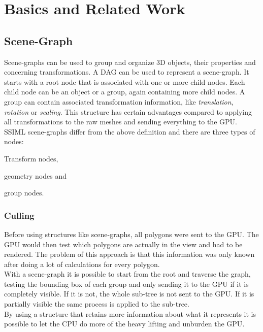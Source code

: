 
\section{Basics and Related Work}
\label{basics-and-related-work}

\subsection{Scene-Graph}\label{scene-graph}

Scene-graphs can be used to group and organize \gls{3D} objects, their properties and
concerning transformations. A \gls{DAG} can be used to represent a scene-graph.
It starts with a root node that is associated with one or more child nodes. Each
child node can be an object or a group, again containing more child nodes. A group can
contain associated transformation information, like \emph{translation},
\emph{rotation} or \emph{scaling}. This structure has certain advantages
compared to applying all transformations to the raw meshes and sending
everything to the \gls{GPU}. \cite{realityprime} \gls{SSIML} scene-graphs differ from the
above definition and there are three types of nodes:

\begin{itemize*}
  \item Transform nodes,
  \item geometry nodes and
  \item group nodes.
\end{itemize*}

\subsubsection{Culling}\label{culling}

Before using structures like scene-graphs, all polygons were sent to
the \gls{GPU}. The \gls{GPU} would then test which polygons are actually in the
view and had to be rendered. The problem of this approach is
that this information was only known after doing a lot of calculations
for every polygon.\\
With a scene-graph it is possible to start from the root and traverse the
graph, testing the bounding box of each group and only sending it to the
\gls{GPU} if it is completely visible. If it is not, the whole sub-tree is not
sent to the \gls{GPU}. If it is partially visible the same process is applied
to the sub-tree.\\
By using a structure that retains more information about what it
represents it is possible to let the CPU do more of the heavy
lifting and unburden the \gls{GPU}.

